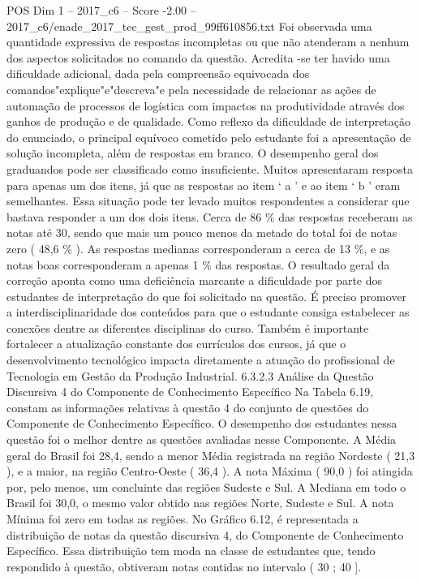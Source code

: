 \begin{textsample}{POS Dim 1 – 2017\_c6 – Score -2.00 – 2017\_c6/enade\_2017\_tec\_gest\_prod\_99ff610856.txt}
Foi observada uma quantidade expressiva de respostas incompletas ou que não atenderam a nenhum dos aspectos solicitados no comando da questão.
Acredita -se ter havido uma dificuldade adicional, dada pela compreensão equivocada dos comandos"explique"e"descreva"e pela necessidade de relacionar as ações de automação de processos de logística com impactos na produtividade através dos ganhos de produção e de qualidade.
Como reflexo da dificuldade de interpretação do enunciado, o principal equívoco cometido pelo estudante foi a apresentação de solução incompleta, além de respostas em branco.
O desempenho geral dos graduandos pode ser classificado como insuficiente.
Muitos apresentaram resposta para apenas um dos itens, já que as respostas ao item ‘ a ’ e ao item ‘ b ’ eram semelhantes.
Essa situação pode ter levado muitos respondentes a considerar que bastava responder a um dos dois itens.
Cerca de 86 \% das respostas receberam as notas até 30, sendo que mais um pouco menos da metade do total foi de notas zero ( 48,6 \% ).
As respostas medianas corresponderam a cerca de 13 \%, e as notas boas corresponderam a apenas 1 \% das respostas.
O resultado geral da correção aponta como uma deficiência marcante a dificuldade por parte dos estudantes de interpretação do que foi solicitado na questão.
É preciso promover a interdisciplinaridade dos conteúdos para que o estudante consiga estabelecer as conexões dentre as diferentes disciplinas do curso.
Também é importante fortalecer a atualização constante dos currículos dos cursos, já que o desenvolvimento tecnológico impacta diretamente a atuação do profissional de Tecnologia em Gestão da Produção Industrial. 6.3.2.3 Análise da Questão Discursiva 4 do Componente de Conhecimento Específico Na Tabela 6.19, constam as informações relativas à questão 4 do conjunto de questões do Componente de Conhecimento Específico.
O desempenho dos estudantes nessa questão foi o melhor dentre as questões avaliadas nesse Componente.
A Média geral do Brasil foi 28,4, sendo a menor Média registrada na região Nordeste ( 21,3 ), e a maior, na região Centro-Oeste ( 36,4 ).
A nota Máxima ( 90,0 ) foi atingida por, pelo menos, um concluinte das regiões Sudeste e Sul.
A Mediana em todo o Brasil foi 30,0, o mesmo valor obtido nas regiões Norte, Sudeste e Sul.
A nota Mínima foi zero em todas as regiões.
No Gráfico 6.12, é representada a distribuição de notas da questão discursiva 4, do Componente de Conhecimento Específico.
Essa distribuição tem moda na classe de estudantes que, tendo respondido à questão, obtiveram notas contidas no intervalo ( 30 ; 40 ].

\end{textsample}
